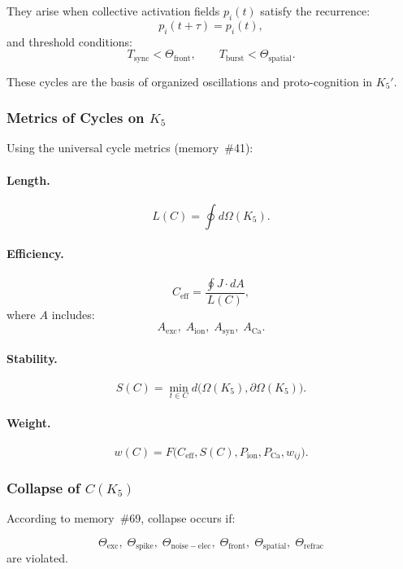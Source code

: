 They arise when collective activation fields
$p_i(t)$ satisfy the recurrence:
\[
  p_i(t+\tau) = p_i(t),
\]
and threshold conditions:
\[
  T_{\mathrm{sync}} < \Theta_{\mathrm{front}},\qquad
  T_{\mathrm{burst}} < \Theta_{\mathrm{spatial}}.
\]

These cycles are the basis of organized oscillations and
proto-cognition in $K_5'$.

\subsubsection{Metrics of Cycles on \texorpdfstring{$K_5$}{K_5}}

Using the universal cycle metrics (memory~\#41):

\paragraph{Length.}
\[
  L(C)=\oint d\Omega(K_5).
\]

\paragraph{Efficiency.}
\[
  C_{\mathrm{eff}}=\frac{\oint J\cdot dA}{L(C)},
\]
where $A$ includes:
\[
  A_{\mathrm{exc}},\;
  A_{\mathrm{ion}},\;
  A_{\mathrm{syn}},\;
  A_{\mathrm{Ca}}.
\]

\paragraph{Stability.}
\[
  S(C) = 
    \min\limits_{t\in C}
      d\bigl(\Omega(K_5),\partial\Omega(K_5)\bigr).
\]

\paragraph{Weight.}
\[
  w(C) =
    F\bigl(C_{\mathrm{eff}}, S(C), P_{\mathrm{ion}},
      P_{\mathrm{Ca}}, w_{ij}\bigr).
\]

\subsubsection{Collapse of \texorpdfstring{$C(K_5)$}{C(K_5)}}

According to memory~\#69, collapse occurs if:

\[
  \Theta_{\mathrm{exc}},\;
  \Theta_{\mathrm{spike}},\;
  \Theta_{\mathrm{noise-elec}},\;
  \Theta_{\mathrm{front}},\;
  \Theta_{\mathrm{spatial}},\;
  \Theta_{\mathrm{refrac}}
\]
are violated.


